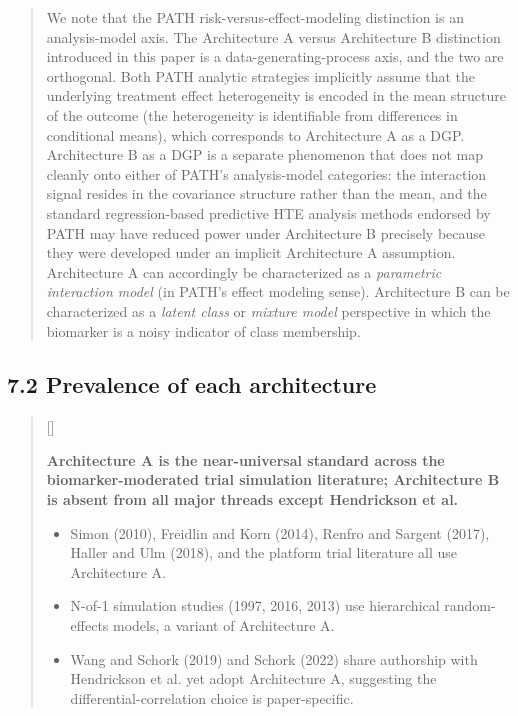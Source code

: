 \documentclass[
  11pt,
]{article}
\newcounter{pgraph}
\newenvironment{bullets}{%
  \stepcounter{pgraph}%
  \begin{quote}\small\sffamily\color[gray]{0.30}%
  {\normalfont\scriptsize\color[gray]{0.58}[\thepgraph]\enspace}}{%
  \end{quote}}
\newenvironment{orig}{%
  \begin{quote}\normalsize\color[gray]{0.55}}{%
  \end{quote}}
\begin{document}
\begin{orig}
We note that the PATH risk-versus-effect-modeling distinction is an
analysis-model axis. The Architecture A versus Architecture B
distinction introduced in this paper is a data-generating-process axis,
and the two are orthogonal. Both PATH analytic strategies implicitly
assume that the underlying treatment effect heterogeneity is encoded in
the mean structure of the outcome (the heterogeneity is identifiable
from differences in conditional means), which corresponds to
Architecture A as a DGP. Architecture B as a DGP is a separate
phenomenon that does not map cleanly onto either of PATH's
analysis-model categories: the interaction signal resides in the
covariance structure rather than the mean, and the standard
regression-based predictive HTE analysis methods endorsed by PATH may
have reduced power under Architecture B precisely because they were
developed under an implicit Architecture A assumption. Architecture A
can accordingly be characterized as a
\textit{parametric interaction model} (in PATH's effect modeling sense).
Architecture B can be characterized as a \textit{latent
class} or \textit{mixture model} perspective in which the biomarker is a
noisy indicator of class membership.

\end{orig}

\subsection{7.2 Prevalence of each architecture}

\begin{bullets}

\textbf{Architecture A is the near-universal standard across the
biomarker-moderated trial simulation literature; Architecture B
is absent from all major threads except Hendrickson et al.}

\begin{itemize}\setlength{\itemsep}{2pt}\setlength{\parskip}{0pt}
\item Simon (2010), Freidlin and Korn (2014), Renfro and Sargent
  (2017), Haller and Ulm (2018), and the platform trial
  literature all use Architecture A.
\item N-of-1 simulation studies (1997, 2016, 2013) use hierarchical random-effects
  models, a variant of Architecture A.
\item Wang and Schork (2019) and Schork (2022) share authorship
  with Hendrickson et al. yet adopt Architecture A, suggesting
  the differential-correlation choice is paper-specific.
\end{itemize}

\end{bullets}
\end{document}
